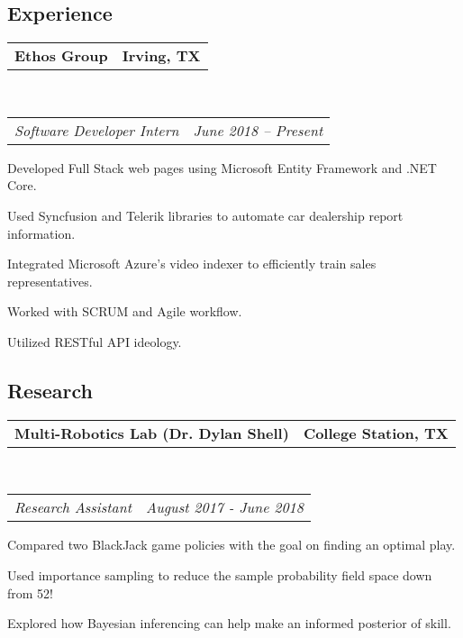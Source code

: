 \documentclass[10pt,letterpaper]{article}
\makeatletter
\newenvironment{indentsection}[1]%
{\begin{list}{}%
	{\setlength{\leftmargin}{#1}}%
	\item[]%
}
{\end{list}}
\newcommand{\headerrow}[2]
{\begin{tabular*}{\linewidth}{l@{\extracolsep{\fill}}r}
	#1 &
	#2 \\
\end{tabular*}}
\makeatother
\begin{document}
\subsection*{Experience}
\begin{indentsection}{\parindent}
	\vspace{-0.4em}
	\headerrow
		{\textbf{Ethos Group}}
		{\textbf{Irving, TX}}
	\\
	\headerrow
		{\emph{Software Developer Intern}}
		{\emph{June 2018 -- Present}}
	\begin{itemize*}
		\item Developed Full Stack web pages using Microsoft Entity Framework and .NET Core. 
		\item Used Syncfusion and Telerik libraries to automate car dealership report information.
		\item Integrated Microsoft Azure's video indexer to efficiently train sales representatives. 
		\item Worked with SCRUM and Agile workflow.
		\item Utilized RESTful API ideology.
	\end{itemize*}
\end{indentsection}

\vspace{-1.8em}
\subsection*{Research}
\begin{indentsection}{\parindent}
	\vspace{-0.4em}
	\headerrow
		{\textbf{Multi-Robotics Lab (Dr. Dylan Shell)}}
		{\textbf{College Station, TX}}
	\\
	\headerrow
		{\emph{Research Assistant}}
		{\emph{August 2017 - June 2018}}
	\begin{itemize*}
		\item Compared two BlackJack game policies with the goal on finding an optimal play. 
		\item Used importance sampling to reduce the sample probability field space down from 				52!
		\item Explored how Bayesian inferencing can help make an informed posterior of skill. 
	\end{itemize*}
\end{indentsection}

\vspace{-1.8em}
\end{document}
